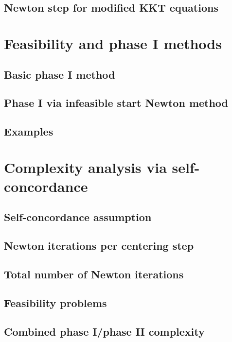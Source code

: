 \subsection{Newton step for modified KKT equations}

\section{Feasibility and phase I methods}

\subsection{Basic phase I method}

\subsection{Phase I via infeasible start Newton method}

\subsection{Examples}

\section{Complexity analysis via self-concordance}

\subsection{Self-concordance assumption}

\subsection{Newton iterations per centering step}

\subsection{Total number of Newton iterations}

\subsection{Feasibility problems}

\subsection{Combined phase I/phase II complexity}

